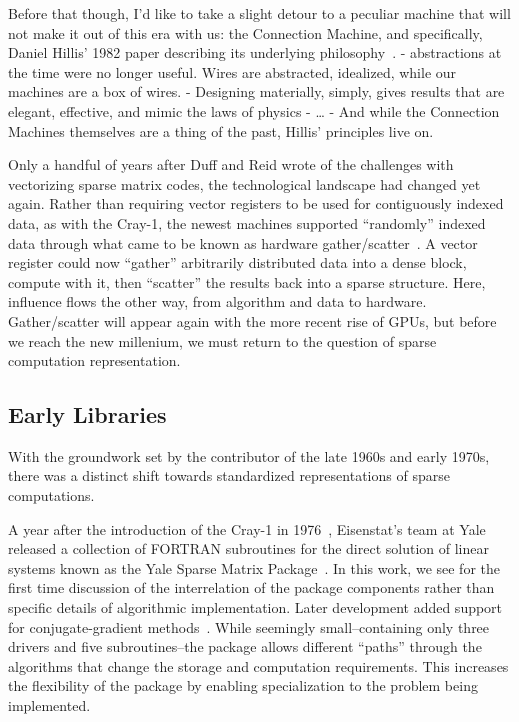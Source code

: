 Before that though, I'd like to take a slight detour to a peculiar machine that will not make it out of this era with us: the Connection Machine, and specifically, Daniel Hillis' 1982 paper describing its underlying philosophy~\cite{daniel1982new}.
- abstractions at the time were no longer useful. Wires are abstracted, idealized, while our machines are a box of wires. 
- Designing materially, simply, gives results that are elegant, effective, and mimic the laws of physics
- \dots
- And while the Connection Machines themselves are a thing of the past, Hillis' principles live on. 



Only a handful of years after Duff and Reid wrote of the challenges with vectorizing sparse matrix codes, the technological landscape had changed yet again.
Rather than requiring vector registers to be used for contiguously indexed data, as with the Cray-1, the newest machines supported \enquote{randomly} indexed data through what came to be known as hardware gather/scatter~\cite{cleveland1987progress}.
A vector register could now \enquote{gather} arbitrarily distributed data into a dense block, compute with it, then \enquote{scatter} the results back into a sparse structure. 
Here, influence flows the other way, from algorithm and data to hardware.
Gather/scatter will appear again with the more recent rise of GPUs, but before we reach the new millenium, we must return to the question of sparse computation representation.

\subsection{Early Libraries}

With the groundwork set by the contributor of the late 1960s and early 1970s, there was a distinct shift towards standardized representations of sparse computations. 

A year after the introduction of the Cray-1 in 1976~\cite{normand2010first}, Eisenstat's team at Yale released a collection of FORTRAN subroutines for the direct solution of linear systems known as the Yale Sparse Matrix Package~\cite{eisenstat1977yale,eisenstat1977yale2}.
In this work, we see for the first time discussion of the interrelation of the package components rather than specific details of algorithmic implementation.
Later development added support for conjugate-gradient methods~\cite{eisenstat1984new}. 
While seemingly small--containing only three drivers and five subroutines--the package allows different \enquote{paths} through the algorithms that change the storage and computation requirements. 
This increases the flexibility of the package by enabling specialization to the problem being implemented.


